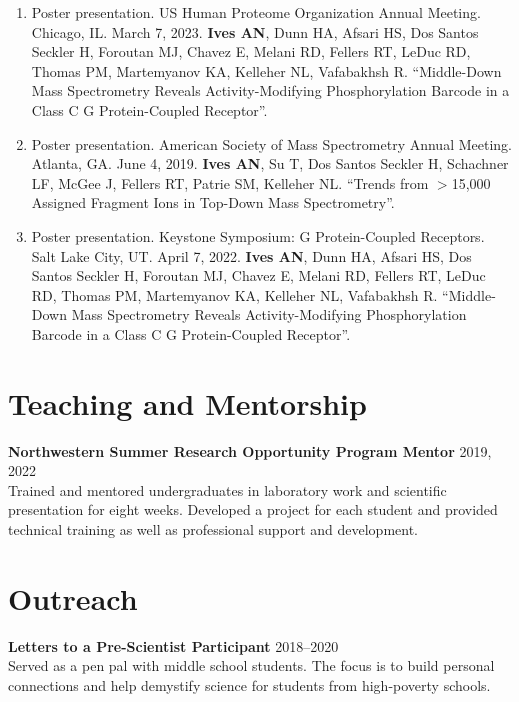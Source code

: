 \documentclass[10pt, letterpaper]{article}
\begin{document}
\begin{enumerate}[leftmargin=*, label=\arabic*., topsep=2pt, itemsep=4pt]
  \item Poster presentation. US Human Proteome Organization Annual Meeting. Chicago, IL.
  March 7, 2023. \textbf{Ives AN}, Dunn HA, Afsari HS, Dos Santos Seckler H, Foroutan MJ, Chavez E,
  Melani RD, Fellers RT, LeDuc RD, Thomas PM, Martemyanov KA, Kelleher NL, Vafabakhsh R.
  ``Middle-Down Mass Spectrometry Reveals Activity-Modifying Phosphorylation Barcode in a Class C
  G Protein-Coupled Receptor''.

  \item Poster presentation. American Society of Mass Spectrometry Annual Meeting. Atlanta, GA.
  June 4, 2019. \textbf{Ives AN}, Su T, Dos Santos Seckler H, Schachner LF, McGee J, Fellers RT,
  Patrie SM, Kelleher NL. ``Trends from $>$15,000 Assigned Fragment Ions in Top-Down Mass
  Spectrometry''.

  \item Poster presentation. Keystone Symposium: G Protein-Coupled Receptors. Salt Lake City, UT. April 7, 2022. \textbf{Ives AN}, Dunn HA, Afsari HS, Dos Santos
  Seckler H, Foroutan MJ, Chavez E, Melani RD, Fellers RT, LeDuc RD, Thomas PM, Martemyanov KA,
  Kelleher NL, Vafabakhsh R. ``Middle-Down Mass Spectrometry Reveals Activity-Modifying
  Phosphorylation Barcode in a Class C G Protein-Coupled Receptor''.

\end{enumerate}

\section{Teaching and Mentorship}

\textbf{Northwestern Summer Research Opportunity Program Mentor} \hfill 2019, 2022 \\
Trained and mentored undergraduates in laboratory work and scientific presentation for eight
weeks. Developed a project for each student and provided technical training as well as professional
support and development.

\section{Outreach}

\textbf{Letters to a Pre-Scientist Participant} \hfill 2018--2020 \\
Served as a pen pal with middle school students. The focus is to build personal connections and
help demystify science for students from high-poverty schools.
\end{document}
